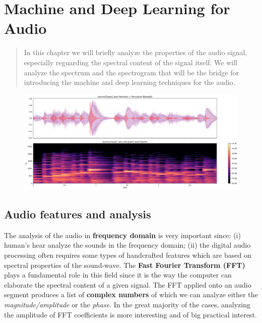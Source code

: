 \chapter{Machine and Deep Learning for Audio}

\begin{quotation}
    \noindent
    \textsf{In this chapter we will briefly analyze the properties of the audio signal, especially reguarding the spectral content of the signal itself. We will analyze the spectrum and the spectrogram that will be the bridge for introducing the machine and deep learning techniques for the audio.}
\end{quotation}

\begin{figure}[h]
    \centering
    \includegraphics[scale=0.35]{img/ML_audio.png}
\end{figure}

\section{Audio features and analysis}
The analysis of the audio in \textbf{frequency domain} is very important since: (i) human's hear analyze the sounds in the frequency domain; (ii) the digital audio processing often requires some types of handcrafted features which are based on spectral properties of the sound-wave. The \textbf{Fast Fourier Transform (FFT)} plays a fundamental role in this field since it is the way the computer can elaborate the spectral content of a given signal. The FFT applied onto an audio segment produces a list of \textbf{complex numbers} of which we can analyze either the \textit{magnitude/amplitude} or the \textit{phase}. In the great majority of the cases, analyzing the amplitude of FFT coefficients is more interesting and of big practical interest.\\


